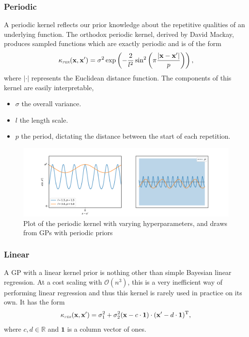 \documentclass[10pt,a4paper]{article}
\numberwithin{equation}{section}
\theoremstyle{plain}
\theoremstyle{definition}
\theoremstyle{own}
\begin{document}
\subsubsection{Periodic}
A periodic kernel reflects our prior knowledge about the repetitive qualities of an underlying function. The orthodox periodic kernel, derived by David Mackay, produces sampled functions which are exactly periodic and is of the form
\begin{equation}
\kappa_{\scaleto{\textit{PER}}{3pt}}(\mathbf{x}, \mathbf{x^{\prime}}) = \sigma^2 \exp \left( -\frac{2}{l^2} \sin^2 \left( \pi \frac{|\mathbf{x} - \mathbf{x}^{\prime}|}{p} \right)  \right),
\end{equation}
where $|\cdot |$ represents the Euclidean distance function. The components of this kernel are easily interpretable,
\begin{itemize}
\item $\sigma$ the overall variance.
\item $l$ the length scale.
\item $p$ the period, dictating the distance between the start of each repetition.
\end{itemize}
\begin{figure}[H]
\includegraphics[width=1.0\textwidth]{per_ker}
\caption{Plot of the periodic kernel with varying hyperparameters, and draws from GPs with periodic priors}
\end{figure}
\subsubsection{Linear}
A GP with a linear kernel prior is nothing other than simple Bayesian linear regression. At a cost scaling with $\mathcal{O}(n^3)$, this is a very inefficient way of performing linear regression and thus this kernel is rarely used in practice on its own. It has the form
\begin{equation}
\kappa_{\scaleto{\textit{PER}}{3pt}}(\mathbf{x}, \mathbf{x^{\prime}}) = \sigma_1^2 + \sigma_2^2 (\mathbf{x} - c \cdot \mathbf{1}) \cdot (\mathbf{x}^{\prime} - d \cdot \mathbf{1})^\text{T},
\end{equation}
where $c, d \in \mathbb{R}$ and $\mathbf{1}$ is a column vector of ones.
\end{document}
